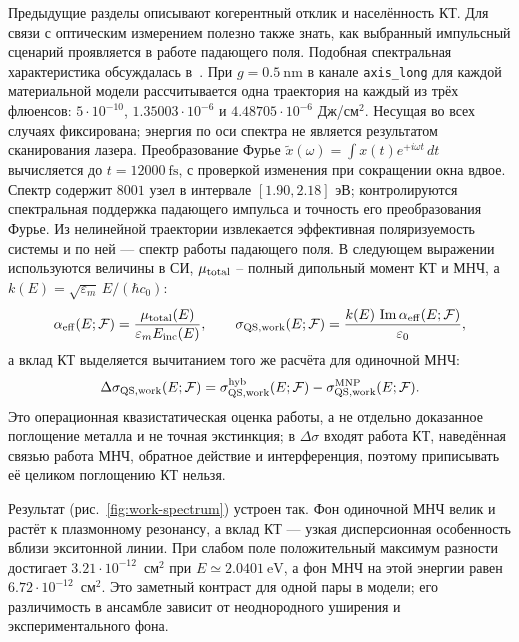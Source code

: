 Предыдущие разделы описывают когерентный отклик и населённость КТ.
Для связи с оптическим измерением полезно также знать, как выбранный
импульсный сценарий проявляется в работе падающего поля. Подобная
спектральная характеристика обсуждалась в~\cite{shah2013}.
При $g=\SI{0.5}{\nano\meter}$ в канале \texttt{axis\_long} для каждой
материальной модели рассчитывается одна траектория на каждый из трёх
флюенсов: $5\cdot10^{-10}$, $1.35003\cdot10^{-6}$ и
$4.48705\cdot10^{-6}$ Дж/см$^2$. Несущая во всех случаях фиксирована;
энергия по оси спектра не является результатом сканирования лазера.
Преобразование Фурье $\widetilde x(\omega)=\int x(t)e^{+i\omega t}\,dt$
вычисляется до $t=\SI{12000}{\femto\second}$, с проверкой изменения
при сокращении окна вдвое. Спектр содержит $8001$ узел в интервале
$[1.90,2.18]$ эВ; контролируются спектральная поддержка падающего импульса
и точность его преобразования Фурье.
Из нелинейной траектории извлекается
эффективная поляризуемость системы и по ней — спектр работы падающего поля.
В следующем выражении используются величины в СИ,
$\mu_{\rm total}$ -- полный дипольный момент КТ и МНЧ,
а $k(E)=\sqrt{\varepsilon_m}\,E/(\hbar c_0)$:
\begin{equation}
  \alpha_{\rm eff}(E;\mathcal F) =
  \frac{\mu_{\rm total}(E)}{\varepsilon_m E_{\rm inc}(E)},
  \qquad
  \sigma_{\rm QS,work}(E;\mathcal F) =
  \frac{k(E)\,\operatorname{Im}\alpha_{\rm eff}(E;\mathcal F)}{\varepsilon_0},
  \label{eq:sigma-work}
\end{equation}
а вклад КТ выделяется вычитанием того же расчёта для одиночной МНЧ:
\begin{equation}
  \Delta\sigma_{\rm QS,work}(E;\mathcal F) =
  \sigma^{\rm hyb}_{\rm QS,work}(E;\mathcal F)
  - \sigma^{\rm MNP}_{\rm QS,work}(E;\mathcal F).
  \label{eq:delta-sigma-work}
\end{equation}
Это операционная квазистатическая оценка работы, а не отдельно доказанное
поглощение металла и не точная экстинкция; в $\Delta\sigma$ входят работа КТ,
наведённая связью работа МНЧ, обратное действие и интерференция, поэтому
приписывать её целиком поглощению КТ нельзя.

Результат (рис.~\ref{fig:work-spectrum}) устроен так. Фон одиночной МНЧ
велик и растёт к плазмонному резонансу, а вклад КТ — узкая дисперсионная
особенность вблизи экситонной линии. При слабом поле положительный максимум
разности достигает $3.21\cdot10^{-12}$~см$^2$ при
$E\simeq\SI{2.0401}{\electronvolt}$, а фон МНЧ на этой энергии равен
$6.72\cdot10^{-12}$~см$^2$. Это заметный контраст для одной пары в модели; его различимость
в ансамбле зависит от неоднородного уширения и экспериментального фона.


